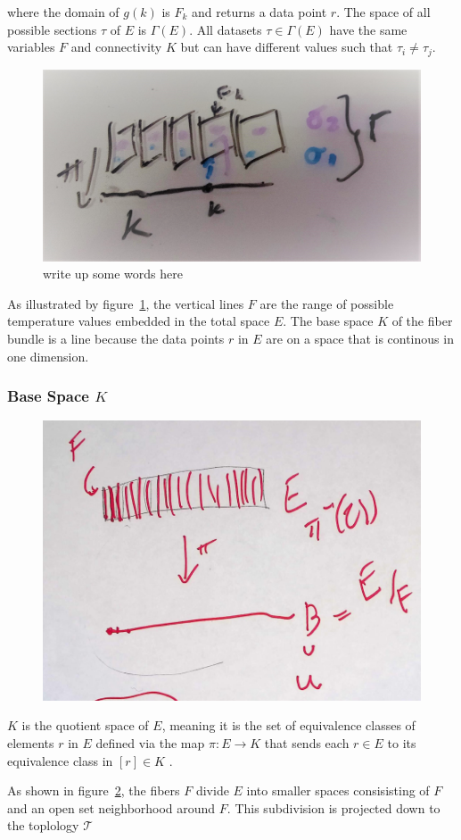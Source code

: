 \documentclass[../main.tex]{subfiles}
\begin{document}
where the domain of $g(k)$ is $F_k$ and returns a data point $r$. The space of all possible sections $\tau$ of $E$ is $\Gamma(E)$. All datasets $\tau \in \Gamma(E)$ have the same variables $F$ and connectivity $K$ but can have different values such that $\tau_{i}\neq\tau_{j}$.

\begin{figure}[ht]
    \includegraphics[width=.2\linewidth]{figures/sections/math/fiberbundle.png}
    \caption{write up some words here}
    \label{fig:fiberbundle}
\end{figure}

As illustrated by figure~\ref{fig:fiberbundle}, the vertical lines $F$ are the range of possible temperature values embedded in the total space $E$. The base space $K$ of the fiber bundle is a line because the data points $r$ in $E$ are on a space that is  continous in one dimension. 

\subsubsection{Base Space $K$}

\begin{figure}[ht]
    \includegraphics[width=0.4\linewidth]{figures/sections/math/k_qspace.png}
    \label{fig:kquote}
\end{figure}

$K$ is the quotient space of $E$, meaning it is the set of equivalence classes of elements $r$ in $E$ defined via the map $\pi: E \rightarrow K$ that sends each $r \in E$ to its equivalence class in $[r] \in K$ \cite{QuotientSpaceTopology2020,QuotientSpaceTopology2020}.

As shown in figure~\ref{fig:kquote}, the fibers $F$ divide $E$ into smaller spaces consisisting of $F$ and an open set neighborhood around $F$. This subdivision is projected down to the toplology $\mathcal{T}$
\end{document}
